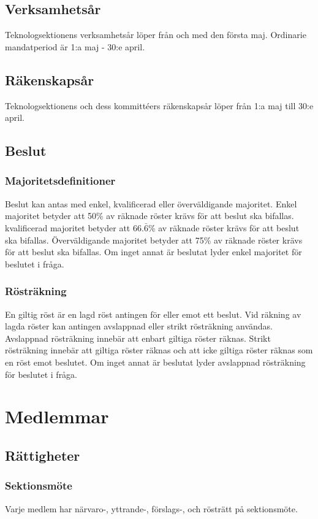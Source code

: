 \documentclass[a4paper]{dtek}
\begin{document}
\subsection{Verksamhetsår}
Teknologsektionens verksamhetsår löper från och med den första maj. Ordinarie mandatperiod är 1:a maj - 30:e april.
\subsection{Räkenskapsår}
Teknologsektionens och dess kommittéers räkenskapsår löper från 1:a maj till 30:e april.
\subsection{Beslut}
\label{sec:beslut}
\subsubsection{Majoritetsdefinitioner}
Beslut kan antas med enkel, kvalificerad eller överväldigande majoritet.
Enkel majoritet betyder att 50\% av räknade röster krävs för att beslut ska bifallas.
kvalificerad majoritet betyder att $66.\bar{6}$\% av räknade röster krävs för att beslut ska bifallas.
Överväldigande majoritet betyder att 75\% av räknade röster krävs för att beslut ska bifallas.
Om inget annat är beslutat lyder enkel majoritet för beslutet i fråga.
\subsubsection{Rösträkning}
En giltig röst är en lagd röst antingen för eller emot ett beslut.
Vid räkning av lagda röster kan antingen avslappnad eller strikt rösträkning användas.
Avslappnad rösträkning innebär att enbart giltiga röster räknas.
Strikt rösträkning innebär att giltiga röster räknas och att icke giltiga röster räknas som en röst emot beslutet.
Om inget annat är beslutat lyder avslappnad rösträkning för beslutet i fråga.

\newpage

\section{Medlemmar}
\subsection{Rättigheter}
\subsubsection{Sektionsmöte}
Varje medlem har närvaro-, yttrande-, förslags-, och rösträtt på sektionsmöte.
\end{document}
